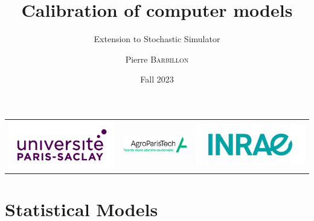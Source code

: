 \documentclass[nopagenumber,9pt]{beamer}
\title[Stochastic Simulator]{Calibration of computer models}
\subtitle{Extension to Stochastic Simulator}
\author[P. Barbillon]{ Pierre \textsc{Barbillon}}
\date{Fall 2023}
\begin{document}
\begin{frame}
\titlepage
\vspace{-1cm}
\centering
\begin{tabular}{ccc}
 \includegraphics[scale=.08]{LogoUPSaclay.jpg}&
  \includegraphics[scale=1.3]{agrologo.png}&
   \includegraphics[scale=.1]{LogoINRAE.jpg}
\end{tabular}


\end{frame}

\section{Statistical Models}
\end{document}
